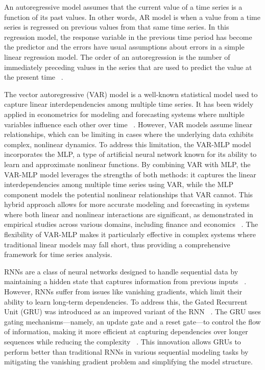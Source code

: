 An autoregressive model assumes that the current value of a time series is a function of its past values. In other words, AR model is when a value from a time series is regressed on previous values from that same time series. In this regression model, the response variable in the previous time period has become the predictor and the errors have usual assumptions about errors in a simple linear regression model. The order of an autoregression is the number of immediately preceding values in the series that are used to predict the value at the present time ~\citep{penn}. 

The vector autoregressive (VAR) model is a well-known statistical model used to capture linear interdependencies among multiple time series. It has been widely applied in econometrics for modeling and forecasting systems where multiple variables influence each other over time ~\citep{lutkepohl2005new}. However, VAR models assume linear relationships, which can be limiting in cases where the underlying data exhibits complex, nonlinear dynamics. To address this limitation, the VAR-MLP model incorporates the MLP, a type of artificial neural network known for its ability to learn and approximate nonlinear functions. By combining VAR with MLP, the VAR-MLP model leverages the strengths of both methods: it captures the linear interdependencies among multiple time series using VAR, while the MLP component models the potential nonlinear relationships that VAR cannot. This hybrid approach allows for more accurate modeling and forecasting in systems where both linear and nonlinear interactions are significant, as demonstrated in empirical studies across various domains, including finance and economics ~\citep{zhang2003time, zivot2006modeling}. The flexibility of VAR-MLP makes it particularly effective in complex systems where traditional linear models may fall short, thus providing a comprehensive framework for time series analysis. 

RNNs are a class of neural networks designed to handle sequential data by maintaining a hidden state that captures information from previous inputs ~\citep{hochreiter1997long}. However, RNNs suffer from issues like vanishing gradients, which limit their ability to learn long-term dependencies. To address this, the Gated Recurrent Unit (GRU) was introduced as an improved variant of the RNN ~\citep{cho2014learning}. The GRU uses gating mechanisms—namely, an update gate and a reset gate—to control the flow of information, making it more efficient at capturing dependencies over longer sequences while reducing the complexity ~\citep{chung2014empirical}. This innovation allows GRUs to perform better than traditional RNNs in various sequential modeling tasks by mitigating the vanishing gradient problem and simplifying the model structure.

